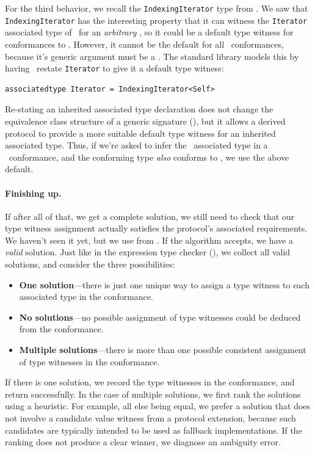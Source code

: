 \documentclass[../generics]{subfiles}
\begin{document}
\begin{example}\label{ex:restate assoc type default}
For the third behavior, we recall the \texttt{IndexingIterator} type from . We saw that \texttt{IndexingIterator} has the interesting property that it can witness the \texttt{Iterator} associated type of \tSequence\ for an \emph{arbitrary} \tCollection, so it could be a default type witness for conformances to \tCollection. However, it cannot be the default for all \tSequence\ conformances, because it's generic argument must be a \tCollection. The standard library models this by having \tCollection\ restate \texttt{Iterator} to give it a default type witness:
\begin{Verbatim}
associatedtype Iterator = IndexingIterator<Self>
\end{Verbatim}
Re-stating an inherited associated type declaration does not change the equivalence class structure of a generic signature (), but it allows a derived protocol to provide a more suitable default type witness for an inherited associated type. Thus, if we're asked to infer the \nIterator\ associated type in a \tSequence\ conformance, and the conforming type \emph{also} conforms to \tCollection, we use the above default.
\end{example}

\paragraph{Finishing up.}
If after all of that, we get a complete solution, we still need to check that our type witness assignment actually satisfies the protocol's associated requirements. We haven't seen it yet, but we use  from . If the algorithm accepts, we have a \emph{valid} solution. Just like in the expression type checker (), we collect all valid solutions, and consider the three possibilities:
\begin{itemize}
\item \textbf{One solution}---there is just one unique way to assign a type witness to each associated type in the conformance.
\item \textbf{No solutions}---no possible assignment of type witnesses could be deduced from the conformance.
\item \textbf{Multiple solutions}---there is more than one possible consistent assignment of type witnesses in the conformance.
\end{itemize}
If there is one solution, we record the type witnesses in the conformance, and return successfully. In the case of multiple solutions, we first rank the solutions using a heuristic. For example, all else being equal, we prefer a solution that does not involve a candidate value witness from a protocol extension, because such candidates are typically intended to be used as fallback implementations. If the ranking does not produce a clear winner, we diagnose an ambiguity error.
\end{document}
